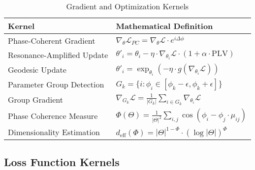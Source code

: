 \begin{table}[h]
\centering
\small
\caption{Gradient and Optimization Kernels}
\label{tab:gradient_kernels}
\begin{tabular}{|p{5cm}|p{9cm}|}
\hline
\textbf{Kernel} & \textbf{Mathematical Definition} \\
\hline
Phase-Coherent Gradient & $\nabla_{\theta} \mathcal{L}_{PC} = \nabla_{\theta} \mathcal{L} \cdot e^{i\Delta\phi}$ \\
\hline
Resonance-Amplified Update & $\theta'_i = \theta_i - \eta \cdot \nabla_{\theta_i} \mathcal{L} \cdot (1 + \alpha \cdot \text{PLV})$ \\
\hline
Geodesic Update & $\theta'_i = \exp_{\theta_i}(-\eta \cdot g(\nabla_{\theta_i} \mathcal{L}))$ \\
\hline
Parameter Group Detection & $G_k = \{i : \phi_i \in [\phi_k - \epsilon, \phi_k + \epsilon]\}$ \\
\hline
Group Gradient & $\nabla_{G_k} \mathcal{L} = \frac{1}{|G_k|} \sum_{i \in G_k} \nabla_{\theta_i} \mathcal{L}$ \\
\hline
Phase Coherence Measure & $\Phi(\Theta) = \frac{1}{|\Theta|^2} \sum_{i,j} \cos(\phi_i - \phi_j \cdot \mu_{ij})$ \\
\hline
Dimensionality Estimation & $d_{\text{eff}}(\Phi) = |\Theta|^{1-\Phi} \cdot (\log|\Theta|)^{\Phi}$ \\
\hline
\end{tabular}
\end{table}

\subsection{Loss Function Kernels}

